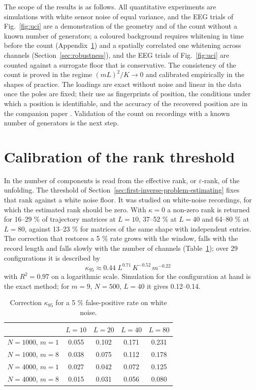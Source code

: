 \documentclass{article}
\begin{document}
The scope of the results is as follows. All quantitative experiments are simulations with white sensor noise of equal variance, and the EEG trials of Fig.~\ref{fig:uci} are a demonstration of the geometry and of the count without a known number of generators; a coloured background requires whitening in time before the count (Appendix~\ref{app:calibration-of-the}) and a spatially correlated one whitening across channels (Section~\ref{sec:robustness}), and the EEG trials of Fig.~\ref{fig:uci} are counted against a surrogate floor that is conservative. The consistency of the count is proved in the regime $(mL)^{2}/K \to 0$ and calibrated empirically in the shapes of practice. The loadings are exact without noise and linear in the data once the poles are fixed; their use as fingerprints of position, the conditions under which a position is identifiable, and the accuracy of the recovered position are in the companion paper \cite{ref-companion}. Validation of the count on recordings with a known number of generators is the next step.

\appendix

\section{Calibration of the rank threshold}\label{app:calibration-of-the}

In \cite{ref-BernadotteBuchstaber, ref-Bernadotte05} the number of components is read from the effective rank, or $\varepsilon$-rank, of the unfolding. The threshold of Section~\ref{sec:first-inverse-problem-estimating} fixes that rank against a white noise floor. It was studied on white-noise recordings, for which the estimated rank should be zero. With $\kappa = 0$ a non-zero rank is returned for 16--29 \% of trajectory matrices at $L = 10$, 37--52 \% at $L = 40$ and 64--80 \% at $L = 80$, against 13--23 \% for matrices of the same shape with independent entries. The correction that restores a 5 \% rate grows with the window, falls with the record length and falls slowly with the number of channels (Table~\ref{tab:kappa}); over 29 configurations it is described by \[
\kappa_{95} \approx 0.44\; L^{0.71}\, K^{-0.52}\, m^{-0.22}
\] with $R^2 = 0.97$ on a logarithmic scale. Simulation for the configuration at hand is the exact method; for $m = 9$, $N = 500$, $L = 40$ it gives 0.12--0.14.

\begin{table}[htb]
\centering
\caption{Correction $\kappa_{95}$ for a 5 \% false-positive rate on white noise.}
\label{tab:kappa}
\begin{tabular}{l c c c c}
\toprule
 & $L = 10$ & $L = 20$ & $L = 40$ & $L = 80$ \\
\midrule
$N = 1000$, $m = 1$ & 0.055 & 0.102 & 0.171 & 0.231 \\
$N = 1000$, $m = 8$ & 0.038 & 0.075 & 0.112 & 0.178 \\
$N = 4000$, $m = 1$ & 0.027 & 0.042 & 0.072 & 0.125 \\
$N = 4000$, $m = 8$ & 0.015 & 0.031 & 0.056 & 0.080 \\
\bottomrule
\end{tabular}
\end{table}
\end{document}
